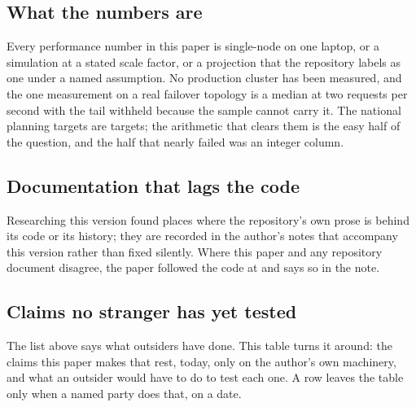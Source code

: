 \subsection{What the numbers are}

Every performance number in this paper is single-node on one laptop, or a simulation at a stated
scale factor, or a projection that the repository labels as one under a named assumption. No
production cluster has been measured, and the one measurement on a real failover topology is a
median at two requests per second with the tail withheld because the sample cannot carry it. The
national planning targets are targets; the arithmetic that clears them is the easy half of the
question, and the half that nearly failed was an integer column.

\subsection{Documentation that lags the code}

Researching this version found places where the repository's own prose is behind its code or its
history; they are recorded in the author's notes that accompany this version rather than fixed
silently. Where this paper and any repository document disagree, the paper
followed the code at  and says so in the note.

\subsection{Claims no stranger has yet tested}

The list above says what outsiders have done. This table turns it around: the claims this paper
makes that rest, today, only on the author's own machinery, and what an outsider would have to do to
test each one. A row leaves the table only when a named party does that, on a date.

